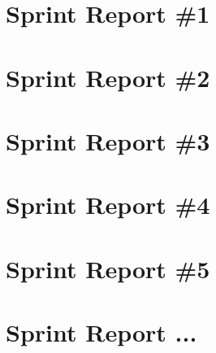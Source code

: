 
\section{Sprint Report \#1}


\newpage
\section{Sprint Report \#2}


\newpage
\section{Sprint Report \#3}


\newpage
\section{Sprint Report \#4}


\newpage
\section{Sprint Report \#5}


\section{Sprint Report ...}
